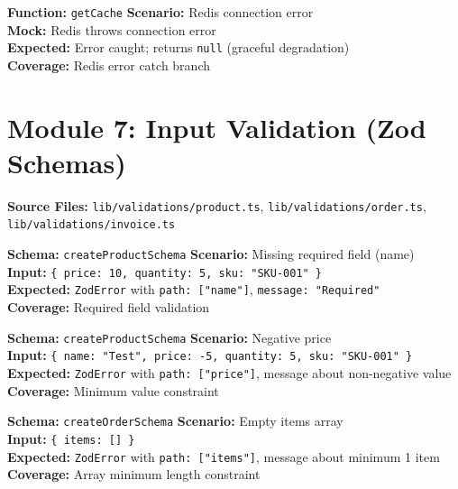 ﻿\documentclass[12pt,a4paper]{report}
\newcommand{\ptwo}{\textbf{\color{p2orange}P2}}
\newcommand{\pthree}{\textbf{\color{p3blue}P3}}
\begin{document}
\begin{tcolorbox}[testbox,title={CACHE-002 \hfill \pthree}]
\textbf{Function:} \texttt{getCache} \quad \textbf{Scenario:} Redis connection error \\
\textbf{Mock:} Redis throws connection error \\
\textbf{Expected:} Error caught; returns \texttt{null} (graceful degradation) \\
\textbf{Coverage:} Redis error catch branch
\end{tcolorbox}

\section{Module 7: Input Validation (Zod Schemas)}

\textbf{Source Files:} \texttt{lib/validations/product.ts}, \texttt{lib/validations/order.ts}, \texttt{lib/validations/invoice.ts}

\begin{tcolorbox}[testbox,title={ZOD-001 \hfill \ptwo}]
\textbf{Schema:} \texttt{createProductSchema} \quad \textbf{Scenario:} Missing required field (name) \\
\textbf{Input:} \texttt{\{ price: 10, quantity: 5, sku: "SKU-001" \}} \\
\textbf{Expected:} \texttt{ZodError} with \texttt{path: ["name"]}, \texttt{message: "Required"} \\
\textbf{Coverage:} Required field validation
\end{tcolorbox}

\begin{tcolorbox}[testbox,title={ZOD-002 \hfill \ptwo}]
\textbf{Schema:} \texttt{createProductSchema} \quad \textbf{Scenario:} Negative price \\
\textbf{Input:} \texttt{\{ name: "Test", price: -5, quantity: 5, sku: "SKU-001" \}} \\
\textbf{Expected:} \texttt{ZodError} with \texttt{path: ["price"]}, message about non-negative value \\
\textbf{Coverage:} Minimum value constraint
\end{tcolorbox}

\begin{tcolorbox}[testbox,title={ZOD-003 \hfill \ptwo}]
\textbf{Schema:} \texttt{createOrderSchema} \quad \textbf{Scenario:} Empty items array \\
\textbf{Input:} \texttt{\{ items: [] \}} \\
\textbf{Expected:} \texttt{ZodError} with \texttt{path: ["items"]}, message about minimum 1 item \\
\textbf{Coverage:} Array minimum length constraint
\end{tcolorbox}
\end{document}
